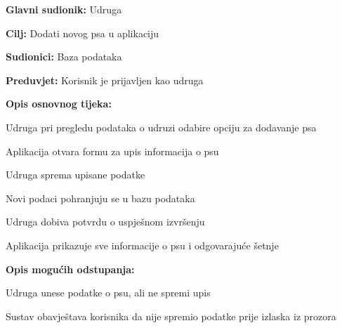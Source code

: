 					
					\noindent {}
					\begin{packed_item}
	
						\item \textbf{Glavni sudionik:} Udruga
						\item  \textbf{Cilj:} Dodati novog psa u aplikaciju
						\item  \textbf{Sudionici:} Baza podataka
						\item  \textbf{Preduvjet:} Korisnik je prijavljen kao udruga
						\item  \textbf{Opis osnovnog tijeka:}
						
						\item[] \begin{packed_enum}
							\item Udruga pri pregledu podataka o udruzi odabire opciju za dodavanje psa
							\item Aplikacija otvara formu za upis informacija o psu
							\item Udruga sprema upisane podatke
							\item Novi podaci pohranjuju se u bazu podataka
							\item Udruga dobiva potvrdu o uspješnom izvršenju
							\item Aplikacija prikazuje sve informacije o psu i odgovarajuće šetnje
							
						\end{packed_enum}
						
						\item  \textbf{Opis mogućih odstupanja:}
						
						\item[] \begin{packed_item}
							\item[3.a] Udruga unese podatke o psu, ali ne spremi upis
							\item[] \begin{packed_enum}
								\item Sustav obavještava korisnika da nije spremio podatke prije izlaska iz prozora
							\end{packed_enum}
						\end{packed_item}
					\end{packed_item}
					
					
					
